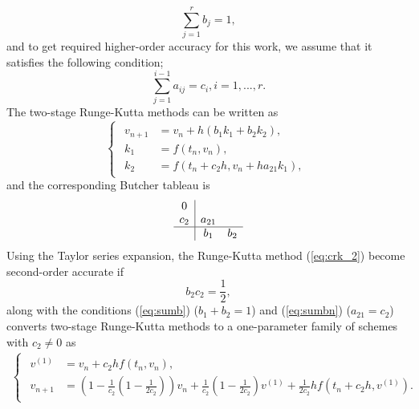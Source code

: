 \documentclass[a4paper, preprint,11pt]{elsarticle}
\numberwithin{equation}{section}
\begin{document}
\begin{equation}    \label{eq:sumb}
\sum_{j=1}^{r}{b_j} = 1,
\end{equation}
and to get required higher-order accuracy for this work, we assume that it satisfies the following condition;
\begin{equation}    \label{eq:sumbn}
\sum_{j=1}^{i-1}{a_{ij}} = c_i, i = 1,...,r.
\end{equation}
The two-stage Runge-Kutta methods can be written as 
\begin{equation}\label{eq:crk_2}   
\begin{cases}
\begin{aligned}
    v_{n+1} &= v_n + h(b_1 k_1 + b_2 k_2), \\
    k_1 &= f(t_n, v_n), \\
    k_2 &= f(t_n + c_2 h, v_n + h a_{21} k_1),
\end{aligned}
\end{cases}
\end{equation}
and the corresponding Butcher tableau is
\[
  \begin{array}{c|cc}
    0 & \\
    c_2 & a_{21} \\
    \hline
      & b_1 & b_2 \\
  \end{array}
\]
Using the Taylor series expansion, the Runge-Kutta method ({\ref{eq:crk_2}}) become second-order accurate if 
\begin{equation}
  b_2 c_2 = \frac{1}{2}, 
  \label{eq:rk_2_con}
\end{equation}
along with the conditions ({\ref{eq:sumb}}) ($b_1+b_2=1$) and ({\ref{eq:sumbn}}) ($a_{21}=c_2$)  converts two-stage Runge-Kutta methods to a one-parameter family of schemes with $c_2 \neq 0$ as
\begin{eqnarray*}
\begin{cases}
\begin{aligned}
v^{(1)} &= v_n + c_2 h f(t_n, v_n), \\
v_{n+1} &= \left(1 - \frac{1}{c_2}\left(1 - \frac{1}{2c_2}\right)\right) v_n 
+ \frac{1}{c_2}\left(1 - \frac{1}{2c_2}\right) v^{(1)} + \frac{1}{2c_2} h f\left(t_n + c_2 h, v^{(1)}\right) .   
\end{aligned}   
\end{cases}    
\end{eqnarray*}
\end{document}
